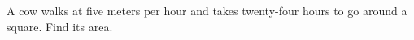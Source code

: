 A cow walks at five meters per hour and takes twenty-four hours to go around a square. Find its area.
